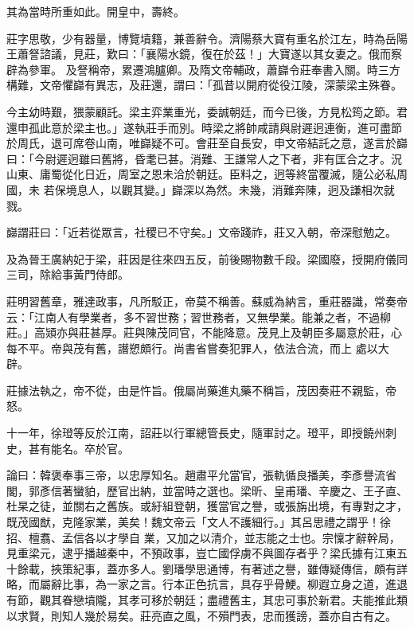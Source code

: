\begin{pinyinscope}
 其為當時所重如此。開皇中，壽終。



 莊字思敬，少有器量，博覽墳籍，兼善辭令。濟陽蔡大寶有重名於江左，時為岳陽王蕭詧諮議，見莊，歎曰：「襄陽水鏡，復在於茲！」大寶遂以其女妻之。俄而察辟為參軍。
 及詧稱帝，累遷鴻臚卿。及隋文帝輔政，蕭巋令莊奉書入關。時三方構難，文帝懼巋有異志，及莊還，謂曰：「孤昔以開府從役江陵，深蒙梁主殊眷。



 今主幼時艱，猥蒙顧託。梁主弈業重光，委誠朝廷，而今已後，方見松筠之節。君還申孤此意於梁主也。」遂執莊手而別。時梁之將帥咸請與尉遲迥連衡，進可盡節於周氏，退可席卷山南，唯巋疑不可。會莊至自長安，申文帝結託之意，遂言於巋曰：「今尉遲迥雖曰舊將，昏耄已甚。消難、王謙常人之下者，非有匡合之才。況山東、庸蜀從化日近，周室之恩未洽於朝廷。臣料之，迥等終當覆滅，隨公必私周國，未
 若保境息人，以觀其變。」巋深以為然。未幾，消難奔陳，迥及謙相次就戮。



 巋謂莊曰：「近若從眾言，社稷已不守矣。」文帝踐祚，莊又入朝，帝深慰勉之。



 及為晉王廣納妃于梁，莊因是往來四五反，前後賜物數千段。梁國廢，授開府儀同三司，除給事黃門侍郎。



 莊明習舊章，雅達政事，凡所駁正，帝莫不稱善。蘇威為納言，重莊器識，常奏帝云：「江南人有學業者，多不習世務；習世務者，又無學業。能兼之者，不過柳莊。」高熲亦與莊甚厚。莊與陳茂同官，不能降意。茂見上及朝臣多屬意於莊，心每不平。帝與茂有舊，譖愬頗行。尚書省嘗奏犯罪人，依法合流，而上
 處以大辟。



 莊據法執之，帝不從，由是忤旨。俄屬尚藥進丸藥不稱旨，茂因奏莊不親監，帝怒。



 十一年，徐璒等反於江南，詔莊以行軍總管長史，隨軍討之。璒平，即授饒州刺史，甚有能名。卒於官。



 論曰：韓褒奉事三帝，以忠厚知名。趙肅平允當官，張軌循良播美，李彥譽流省閣，郭彥信著蠻貃，歷官出納，並當時之選也。梁昕、皇甫璠、辛慶之、王子直、杜杲之徒，並關右之舊族。或紆組登朝，獲當官之譽，或張旃出境，有專對之才，既茂國猷，克隆家業，美矣！魏文帝云「文人不護細行。」其呂思禮之謂乎！徐招、檀翥、孟信各以才學自
 業，又加之以清介，並志能之士也。宗懍才辭幹局，見重梁元，逮乎播越秦中，不預政事，豈亡國俘虜不與圖存者乎？梁氏據有江東五十餘載，挾策紀事，蓋亦多人。劉璠學思通博，有著述之譽，雖傳疑傳信，頗有詳略，而屬辭比事，為一家之言。行本正色抗言，具存乎骨鯁。柳遐立身之道，進退有節，觀其眷戀墳隴，其孝可移於朝廷；盡禮舊主，其忠可事於新君。夫能推此類以求賢，則知人幾於易矣。莊亮直之風，不殞門表，忠而獲謗，蓋亦自古有之。



\end{pinyinscope}